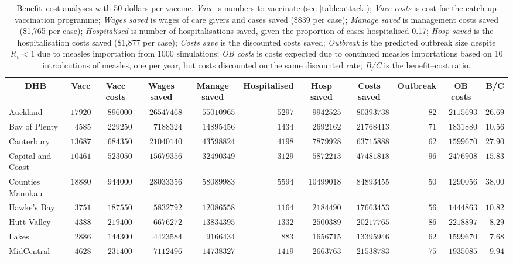 \documentclass{article}
\begin{document}
\begin{table}\small
\caption{Benefit--cost analyses with 50 dollars per vaccine. \textit{Vacc} is numbers to vaccinate (see \autoref{table:attack}); \textit{Vacc costs} is cost for the catch up vaccination programme; \textit{Wages saved} is wages of care givers and cases saved (\$839 per case); \textit{Manage saved} is management costs saved (\$1,765 per case); \textit{Hospitalised} is number of hospitalisations saved, given the proportion of cases hospitalised 0.17; \textit{Hosp saved} is the hospitalisation costs saved (\$1,877 per case); \textit{Costs save}  is the discounted costs saved; \textit{Outbreak}	is the predicted outbreak size despite $R_v < 1$ due to measles importation from 1000 simulations; \textit{OB costs}	is costs expected due to continued measles importations based on 10 introdcutions of measles, one per year, but costs discounted on the same discounted rate; \textit{B/C} is the benefit--cost ratio.}
\begin{center}
\begin{tabular}{lrrrrrrrrrr}
\hline\hline
\multicolumn{1}{c}{DHB}&\multicolumn{1}{c}{Vacc}&\multicolumn{1}{c}{Vacc costs}&\multicolumn{1}{c}{Wages saved}&\multicolumn{1}{c}{Manage saved}&\multicolumn{1}{c}{Hospitalised}&\multicolumn{1}{c}{Hosp saved}&\multicolumn{1}{c}{Costs saved}&\multicolumn{1}{c}{Outbreak}&\multicolumn{1}{c}{OB costs}&\multicolumn{1}{c}{B/C}\tabularnewline
\hline
Auckland&$17920$&$896000$&$26547468$&$55010965$&$5297$&$ 9942525$&$80393738$&$ 82$&$2115693$&$26.69$\tabularnewline
Bay of Plenty&$ 4585$&$229250$&$ 7188324$&$14895456$&$1434$&$ 2692162$&$21768413$&$ 71$&$1831880$&$10.56$\tabularnewline
Canterbury&$13687$&$684350$&$21040140$&$43598824$&$4198$&$ 7879928$&$63715888$&$ 62$&$1599670$&$27.90$\tabularnewline
Capital and Coast&$10461$&$523050$&$15679356$&$32490349$&$3129$&$ 5872213$&$47481818$&$ 96$&$2476908$&$15.83$\tabularnewline
Counties Manukau&$18880$&$944000$&$28033356$&$58089983$&$5594$&$10499018$&$84893455$&$ 50$&$1290056$&$38.00$\tabularnewline
Hawke's Bay&$ 3751$&$187550$&$ 5832792$&$12086558$&$1164$&$ 2184490$&$17663453$&$ 56$&$1444863$&$10.82$\tabularnewline
Hutt Valley&$ 4388$&$219400$&$ 6676272$&$13834395$&$1332$&$ 2500389$&$20217765$&$ 86$&$2218897$&$ 8.29$\tabularnewline
Lakes&$ 2886$&$144300$&$ 4423584$&$ 9166434$&$ 883$&$ 1656715$&$13395946$&$ 62$&$1599670$&$ 7.68$\tabularnewline
MidCentral&$ 4628$&$231400$&$ 7112496$&$14738327$&$1419$&$ 2663763$&$21538783$&$ 75$&$1935085$&$ 9.94$\tabularnewline

\end{tabular}
\end{center}
\end{table}
\end{document}

